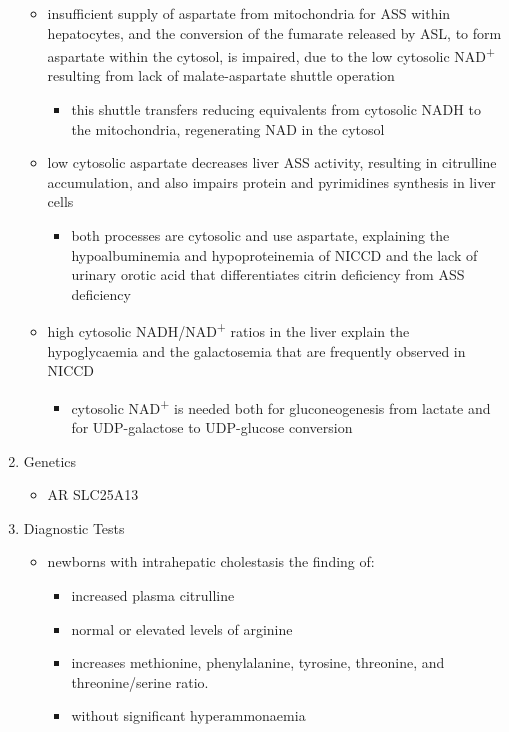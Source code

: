 \documentclass[12pt]{scrartcl}
\begin{document}
\begin{center}
\begin{center}
\begin{enumerate}
\begin{itemize}
\item insufficient supply of aspartate from mitochondria for ASS within
hepatocytes, and the conversion of the fumarate released by ASL, to
form aspartate within the cytosol, is impaired, due to the low
cytosolic NAD\textsuperscript{+} resulting from lack of malate-aspartate shuttle
operation
\begin{itemize}
\item this shuttle transfers reducing equivalents from cytosolic NADH
to the mitochondria, regenerating NAD in the cytosol
\end{itemize}
\item low cytosolic aspartate decreases liver ASS activity, resulting in
citrulline accumulation, and also impairs protein and pyrimidines
synthesis in liver cells
\begin{itemize}
\item both processes are cytosolic and use aspartate, explaining the
hypoalbuminemia and hypoproteinemia of NICCD and the lack of
urinary orotic acid that differentiates citrin deficiency from
ASS deficiency
\end{itemize}
\item high cytosolic NADH/NAD\textsuperscript{+} ratios in the liver explain the
hypoglycaemia and the galactosemia that are frequently observed in
NICCD
\begin{itemize}
\item cytosolic NAD\textsuperscript{+} is needed both for gluconeogenesis from lactate and
for UDP-galactose to UDP-glucose conversion
\end{itemize}
\end{itemize}

\item Genetics
\label{sec:org8b324f6}
\begin{itemize}
\item AR SLC25A13
\end{itemize}

\item Diagnostic Tests
\label{sec:org9a16217}
\begin{itemize}
\item newborns with intrahepatic cholestasis the finding of:
\begin{itemize}
\item increased plasma citrulline
\item normal or elevated levels of arginine
\item increases methionine, phenylalanine, tyrosine, threonine, and threonine/serine ratio.
\item without significant hyperammonaemia


\end{itemize}
\end{itemize}
\end{enumerate}
\end{center}
\end{center}
\end{document}

